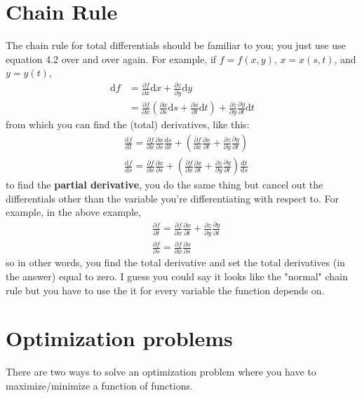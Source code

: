 \documentclass[oneside]{book}
\numberwithin{equation}{chapter} %
\begin{document}
\section{Chain Rule}
The chain rule for total differentials should be familiar to you; you just use use equation 4.2 over and over again. For example, if $f=f(x,y)$, $x=x(s,t)$, and $y=y(t)$, 
\begin{align*}
	\mathrm df&=\frac{\partial f}{\partial x}\mathrm dx+\frac{\partial z}{\partial y}\mathrm dy\\
	&=\frac{\partial f}{\partial x}\left( \frac{\partial x}{\partial s}\mathrm ds+\frac{\partial x}{\partial t}\mathrm dt \right)+\frac{\partial z}{\partial y}\frac{\partial y}{\partial t}\mathrm dt
\end{align*}
from which you can find the (total) derivatives, like this:
\begin{align*}
&\frac{\mathrm df}{\mathrm dt}=\frac{\partial f}{\partial x} \frac{\partial x}{\partial s}\frac{\mathrm ds}{\mathrm dt}+\left( \frac{\partial f}{\partial x}\frac{\partial x}{\partial t}+ \frac{\partial z}{\partial y}\frac{\partial y}{\partial t} \right)\\
&\frac{\mathrm df}{\mathrm ds}=\frac{\partial f}{\partial x} \frac{\partial x}{\partial s}+\left( \frac{\partial f}{\partial x}\frac{\partial x}{\partial t}+ \frac{\partial z}{\partial y}\frac{\partial y}{\partial t} \right)\frac{\mathrm dt}{\mathrm ds}
\end{align*}
to find the \textbf{partial derivative}, you do the same thing but cancel out the differentials other than the variable you're differentiating with respect to. For example, in the above example, 
\begin{align*}
	&\frac{\partial f}{\partial t}=\frac{\partial f}{\partial x}\frac{\partial x}{\partial t}+ \frac{\partial z}{\partial y}\frac{\partial y}{\partial t} \\
	&\frac{\partial f}{\partial s}=\frac{\partial f}{\partial x} \frac{\partial x}{\partial s}
\end{align*}
so in other words, you find the total derivative and set the total derivatives (in the answer) equal to zero. I guess you could say it looks like the "normal" chain rule but you have to use the it for every variable the function depends on. 
\section{Optimization problems}
There are two ways to solve an optimization problem where you have to maximize/minimize a function of functions.\\
\end{document}
